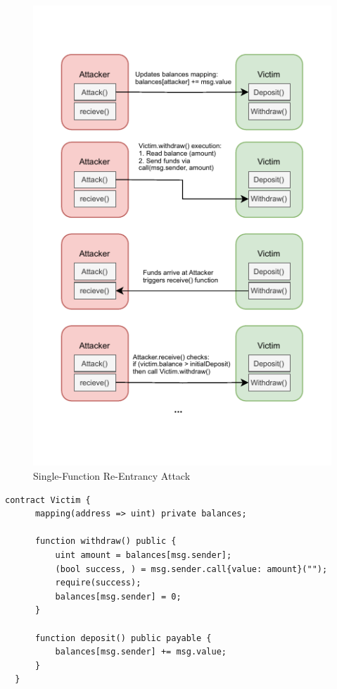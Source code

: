 \documentclass[12pt]{article}
\begin{document}
\begin{figure}[H]
\begin{minipage}{0.45\textwidth}
  \includegraphics[width=\textwidth]{reentrancy.pdf}
\end{minipage}
\caption{Single-Function Re-Entrancy Attack}
\label{fig:reentrancy}
\end{figure}

\begin{lstlisting}[language=Solidity, caption=Single-Function Re-Entrancy Vulnerable Contract]
  contract Victim {
      mapping(address => uint) private balances;
  
      function withdraw() public {
          uint amount = balances[msg.sender];
          (bool success, ) = msg.sender.call{value: amount}("");
          require(success);
          balances[msg.sender] = 0;
      }
  
      function deposit() public payable {
          balances[msg.sender] += msg.value;
      }
  }
\end{lstlisting}
  
\end{document}
